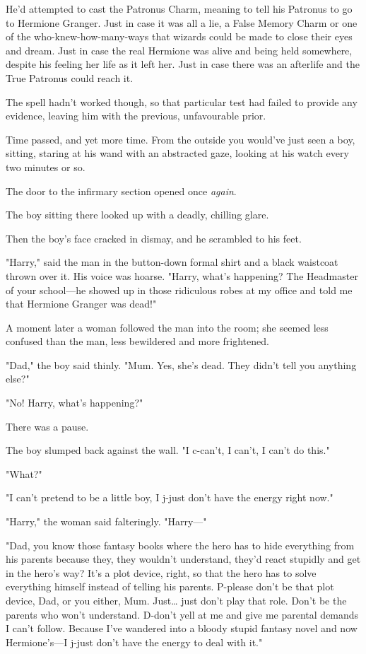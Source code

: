 He'd attempted to cast the Patronus Charm, meaning to tell his Patronus to go
to Hermione Granger. Just in case it was all a lie, a False Memory Charm or one
of the who-knew-how-many-ways that wizards could be made to close their eyes
and dream. Just in case the real Hermione was alive and being held somewhere,
despite his feeling her life as it left her. Just in case there was an
afterlife and the True Patronus could reach it.

The spell hadn't worked though, so that particular test had failed to provide
any evidence, leaving him with the previous, unfavourable prior.

Time passed, and yet more time. From the outside you would've just seen a boy,
sitting, staring at his wand with an abstracted gaze, looking at his watch
every two minutes or so.

The door to the infirmary section opened once \emph{again}.

The boy sitting there looked up with a deadly, chilling glare.

Then the boy's face cracked in dismay, and he scrambled to his feet.

"Harry," said the man in the button-down formal shirt and a black waistcoat thrown
over it. His voice was hoarse. "Harry, what's happening? The Headmaster of your
school---he showed up in those ridiculous robes at my office and told me that
Hermione Granger was dead!"

A moment later a woman followed the man into the room; she seemed less confused
than the man, less bewildered and more frightened.

"Dad," the boy said thinly. "Mum. Yes, she's dead. They didn't tell you
anything else?"

"No! Harry, what's happening?"

There was a pause.

The boy slumped back against the wall. "I c-can't, I can't, I can't do this."

"What?"

"I can't pretend to be a little boy, I j-just don't have the energy right now."

"Harry," the woman said falteringly. "Harry---"

"Dad, you know those fantasy books where the hero has to hide everything from
his parents because they, they wouldn't understand, they'd react stupidly and
get in the hero's way? It's a plot device, right, so that the hero has to solve
everything himself instead of telling his parents. P-please don't be that plot
device, Dad, or you either, Mum. Just{\ldots} just don't play that role. Don't
be the parents who won't understand. D-don't yell at me and give me parental
demands I can't follow. Because I've wandered into a bloody stupid fantasy
novel and now Hermione's---I j-just don't have the energy to deal with it."


